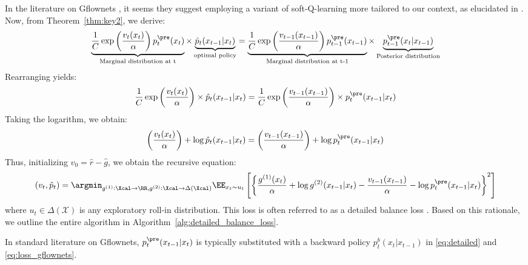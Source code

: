 In the literature on Gflownets \citep{bengio2023gflownet}, it seems they suggest employing a variant of soft-Q-learning more tailored to our context, as elucidated in \citet{mohammadpour2023maximum,tiapkin2023generative,deleu2024discrete}.
Now, from Theorem~\ref{thm:key2}, we derive:
\begin{align*}
     \underbrace{\frac{1}{C}\exp\left (\frac{ v_{t}(x_{t})}{\alpha} \right )p^{\pre}_t(x_t) }_{\text{Marginal distribution at t}}\times   \underbrace{\hat p_t(x_{t-1}|x_{t})}_{\text{optimal policy}} = \underbrace{\frac{1}{C} \exp\left (\frac{ v_{t-1}(x_{t-1})}{\alpha} \right ) p^{\pre}_{t-1}(x_{t-1})}_{\text{Marginal distribution at t-1} }\times  \underbrace{p^{\pre}_{t-1}(x_{t}|x_{t-1})}_{\text{Posterior distribution}}
\end{align*}
Rearranging yields:
\begin{align*}
    \frac{1}{C}\exp\left (\frac{ v_{t}(x_{t})}{\alpha} \right )\times \hat p_t(x_{t-1}|x_{t}) = \frac{1}{C} \exp\left (\frac{ v_{t-1}(x_{t-1})}{\alpha} \right ) \times  p^{\pre}_t(x_{t-1}|x_{t})
\end{align*}
Taking the logarithm, we obtain: 
\begin{align}\label{eq:detailed}
    \left(\frac{ v_{t}(x_{t})}{\alpha}\right) + \log \hat p_t(x_{t-1}|x_{t}) =  \left( \frac{ v_{t-1}(x_{t-1})}{\alpha}\right) + \log  p^{\pre}_t(x_{t-1}|x_{t})
\end{align}
Thus, initializing $v_{0}=\hat r-\hat g$, we obtain the recursive equation: 
{\small 
\begin{align}\label{eq:loss_gflownets}
    (v_t,\hat p_t) = \argmin_{g^{(1)}:\Xcal \to \RR, g^{(2)}:\Xcal \to \Delta(\Xcal)}\EE_{x_t \sim u_t}\left[  \left\{  \frac{ g^{(1)}(x_{t})}{\alpha}  + \log g^{(2)}(x_{t-1}|x_{t})-  \frac{ v_{t-1}(x_{t-1})}{\alpha} -  \log  p^{\pre}_t(x_{t-1}|x_{t})\right\}^2 \right ]
\end{align}
} 
where $u_t \in \Delta(\mathcal{X})$ is any exploratory roll-in distribution. This loss is often referred to as a detailed balance loss \citep{bengio2023gflownet}. Based on this rationale, we outline the entire algorithm in Algorithm~\ref{alg:detailed_balance_loss}.

\begin{remark}
In standard literature on Gflownets, $p^{\pre}_t(x_{t-1}|x_t)$ is typically substituted with a backward policy $p^{b}_t(x_{t}|x_{t-1})$ in \eqref{eq:detailed} and \eqref{eq:loss_gflownets}.
\end{remark}






